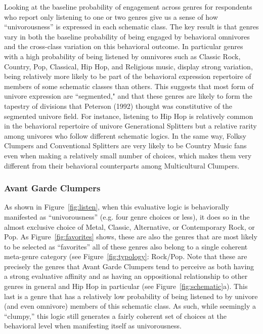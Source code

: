 \documentclass[preprint,12pt]{elsarticle}
\begin{document}
Looking at the baseline probability of engagement across genres for respondents who report only listening to one or two genres give us a sense of how ``univorousness'' is expressed in each schematic class. The key result is that genres vary in both the baseline probability of being engaged by behavioral omnivores and the cross-class variation on this behavioral outcome. In particular genres with a high probability of being listened by omnivores such as Classic Rock, Country, Pop, Classical, Hip Hop, and Religious music, display strong variation, being relatively more likely to be part of the behavioral expression repertoire of members of some schematic classes than others. This suggests that most form of univore expression are ``segmented," and that these genres are likely to form the tapestry of divisions that Peterson (1992) thought was constitutive of the segmented univore field. For instance, listening to Hip Hop is relatively common in the behavioral repertoire of univore Generational Splitters but a relative rarity among univores who follow different schematic logics. In the same way, Folksy Clumpers and Conventional Splitters are very likely to be Country Music fans even when making a relatively small number of choices, which makes them very different from their behavioral counterparts among Multicultural Clumpers. 

\subsubsection{Avant Garde Clumpers} 
As shown in Figure~\ref{fig:listen}, when this evaluative logic is behaviorally manifested as ``univorousness'' (e.g. four genre choices or less), it does so in the almost exclusive choice of Metal, Classic, Alternative, or Contemporary Rock, or Pop. As Figure~\ref{fig:favorites} shows, these are also the genres that are most likely to be selected as ``favorites'' all of these genres also belong to a single coherent meta-genre category (see Figure~\ref{fig:typology}: Rock/Pop.  Note that these are precisely the genres that Avant Garde Clumpers tend to perceive as both having a strong evaluative affinity and as having an oppositional relationship to other genres in general and Hip Hop in particular (see Figure~\ref{fig:schematic}a). This last is a genre that has a relatively low probability of being listened to by univore (and even omnivore) members of this schematic class. As such, while seemingly a ``clumpy,'' this logic still generates a fairly coherent set of choices at the behavioral level when manifesting itself as univorousness.  
\end{document}
